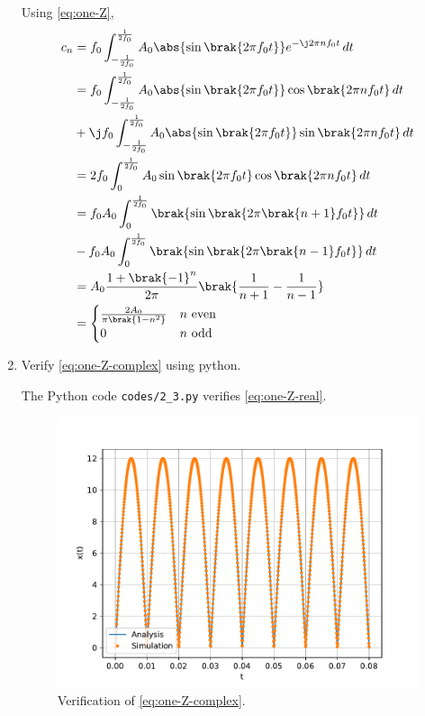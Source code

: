 \documentclass[journal,12pt,twocolumn]{IEEEtran}
\renewcommand\thesection{\arabic{section}}
\begin{document}
\begin{enumerate}[label=\thesection.\arabic*,ref=\thesection.\theenumi]
\solution Using \eqref{eq:one-Z},
\begin{align}
    c_n &= f_0\int_{-\frac{1}{2f_0}}^{\frac{1}{2f_0}}A_0\abs{\sin\brak{2\pi f_0t}}
    e^{-\j2\pi nf_0t}\, dt \\
        &= f_0\int_{-\frac{1}{2f_0}}^{\frac{1}{2f_0}}A_0\abs{\sin\brak{2\pi f_0t}}
    \cos\brak{2\pi nf_0t}\, dt \nonumber \\
        &+ \j f_0\int_{-\frac{1}{2f_0}}^{\frac{1}{2f_0}}A_0
        \abs{\sin\brak{2\pi f_0t}}\sin\brak{2\pi nf_0t}\, dt \\
        &= 2f_0\int_{0}^{\frac{1}{2f_0}}A_0\sin\brak{2\pi f_0t}\cos\brak{2\pi nf_0t}\, dt \\
        &= f_0A_0\int_{0}^{\frac{1}{2f_0}}\brak{\sin\brak{2\pi\brak{n+1}f_0t}}\, dt \nonumber \\ 
        &- f_0A_0\int_{0}^{\frac{1}{2f_0}}\brak{\sin\brak{2\pi\brak{n-1}f_0t}}\, dt \\ 
        &= A_0\frac{1+\brak{-1}^n}{2\pi}\brak{\frac{1}{n+1} - \frac{1}{n-1}} \\
        &= 
        \begin{cases}
            \frac{2A_0}{\pi\brak{1-n^2}} & n\ \text{even} \\
            0 & n\ \text{odd}
        \end{cases}
        \label{eq:ck-xt}
\end{align}
\item Verify 
	\eqref{eq:one-Z-complex}
	using python.

\solution The Python code \texttt{codes/2\_3.py} verifies \eqref{eq:one-Z-real}.
\begin{figure}[!ht]
    \includegraphics[width=\columnwidth]{figs/2_3.pdf}
    \caption{Verification of \eqref{eq:one-Z-complex}.}
    \label{fig:ver-complex}
\end{figure}


\end{enumerate}
\end{document}
